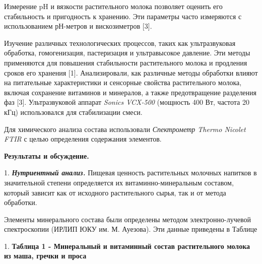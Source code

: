 \begin{multicols}{2}
Измерение pH и вязкости растительного молока позволяет оценить его
стабильность и пригодность к хранению. Эти параметры часто измеряются с
использованием рН-метров и вискозиметров {[}3{]}.

Изучение различных технологических процессов, таких как ультразвуковая
обработка, гомогенизация, пастеризация и ультравысокое давление. Эти
методы применяются для повышения стабильности растительного молока и
продления сроков его хранения {[}1{]}. Анализировали, как различные
методы обработки влияют на питательные характеристики и сенсорные
свойства растительного молока, включая сохранение витаминов и минералов,
а также предотвращение разделения фаз {[}3{]}. Ультразвуковой аппарат
\emph{Sonics VCX-500} (мощность 400 Вт, частота 20 кГц) использовался
для стабилизации смеси.

Для химического анализа состава использовали \emph{Спектрометр Thermo
Nicolet FTIR} с целью определения содержания элементов.

{\bfseries Результаты и обсуждение.}

1. \emph{{\bfseries Нутриентный анализ.}} Пищевая ценность растительных
молочных напитков в
значительной степени определяется их витаминно-минеральным составом,
который зависит как от исходного растительного сырья, так и от метода
обработки.

Элементы минерального состава были определены методом электронно-лучевой
спектроскопии (ИРЛИП ЮКУ им. М. Ауезова). Эти данные приведены в Таблице
\end{multicols}

1. {\bfseries Таблица 1 - Минеральный и витаминный состав растительного молока
из маша, гречки и проса}


